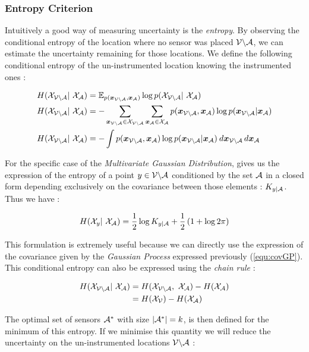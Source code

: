 \documentclass[12pt,twoside]{report}
\begin{document}
\subsubsection{Entropy Criterion}

Intuitively a good way of measuring uncertainty is the \textit{entropy}. By observing the conditional entropy of the location where no sensor was placed $\mathcal{V} \backslash\mathcal{A}$, we can estimate the uncertainty remaining for those locations. We define the following conditional entropy of the un-instrumented location knowing the instrumented ones \citep[p.~16]{cover_elements_1991} :

\begin{align}
	H(\X_{\VA} | \X_\A) &= \mathbb{E}_{p(\vec{x}_{\VA},\vec{x}_\A)} \log p(\X_{\VA} | \X_\A) \\
	H(\X_{\VA} | \X_\A) &= - \sum_{\vec{x}_{\VA} \in \X_{\VA}}\sum_{\vec{x}_{\A} \in \X_{\A}} p(\vec{x}_{\VA},\vec{x}_\A) \log p(\vec{x}_{\VA}|\vec{x}_\A) \\
	H(\X_{\VA} | \X_\A) &= - \int p(\vec{x}_{\VA},\vec{x}_\A) \log p(\vec{x}_{\VA}|\vec{x}_\A) \: d\vec{x}_{\VA} \, d\vec{x}_\A 
\end{align}

For the specific case of the \textit{Multivariate Gaussian Distribution}, \citet{krause_near-optimal_2008} gives us the expression of the entropy of a point $y \in \mathcal{V} \backslash\mathcal{A}$ conditioned by the set $\mathcal{A}$ in a closed form depending exclusively on the covariance between those elements : $K_{y | \mathcal{A}}$. Thus we have :  

\begin{equation}
	H(\X_{y} | \X_\A) = \frac{1}{2} \log K_{y | \A} + \frac{1}{2} \left(1 + \log 2\pi  \right) \label{equ:entGP}
\end{equation}

This formulation is extremely useful because we can directly use the expression of the covariance given by the \textit{Gaussian Process} expressed previously (\ref{equ:covGP}). \\


This conditional entropy can also be expressed using the \textit{chain rule}  \citep[p.~16]{cover_elements_1991} : 

\begin{align}
	H(\X_{\VA} | \X_\A) &= H(\X_{\VA} ,  \X_\A) -  H(\X_{\A}) \\
	&= H(\X_{\V}) -  H(\X_{\A}) 
\label{equ:chainentropy}
\end{align}

The optimal set of sensors $\mathcal{A}^*$ with size $|\mathcal{A}^*| = k$, is then defined for the minimum of this entropy. If we minimise this quantity we will reduce the uncertainty on the un-instrumented locations $\mathcal{V} \backslash\mathcal{A}$ : 
\end{document}
